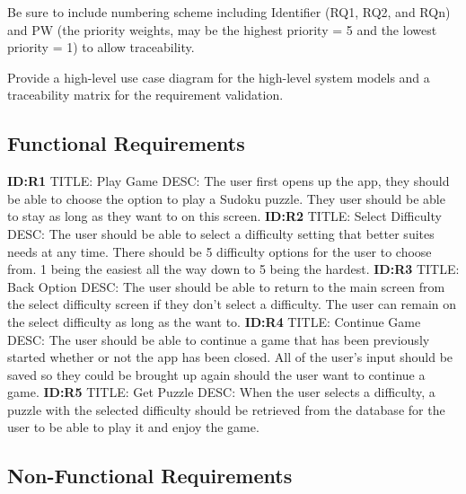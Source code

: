 \documentclass{article}
\begin{document}
Be sure to include numbering scheme including Identifier (RQ1, RQ2, and RQn) and PW (the priority weights, may be the highest priority = 5 and the lowest priority = 1) to allow traceability.

Provide a high-level use case diagram for the high-level system models and a traceability matrix for the requirement validation.
 
\subsection{Functional Requirements}

\textbf{ID:R1} \newline TITLE: Play Game \newline DESC: The user first opens up the app, they should be able to choose the option to play a Sudoku puzzle. They user should be able to stay as long as they want to on this screen.\newline
\textbf{ID:R2} \newline TITLE: Select Difficulty \newline DESC: The user should be able to select a difficulty setting that better suites needs at any time. There should be 5 difficulty options for the user to choose from. 1 being the easiest all the way down to 5 being the hardest.
\textbf{ID:R3} \newline TITLE: Back Option \newline DESC: The user should be able to return to the main screen from the select difficulty screen if they don't select a difficulty. The user can remain on the select difficulty as long as the want to.\newline
\textbf{ID:R4} \newline TITLE: Continue Game \newline DESC: The user should be able to continue a game that has been previously started whether or not the app has been closed. All of the user's input should be saved so they could be brought up again should the user want to continue a game.\newline 
\textbf{ID:R5} \newline TITLE: Get Puzzle \newline DESC: When the user selects a difficulty, a puzzle with the selected difficulty should be retrieved from the database for the user to be able to play it and enjoy the game.


\subsection{Non-Functional Requirements} 
\end{document}
